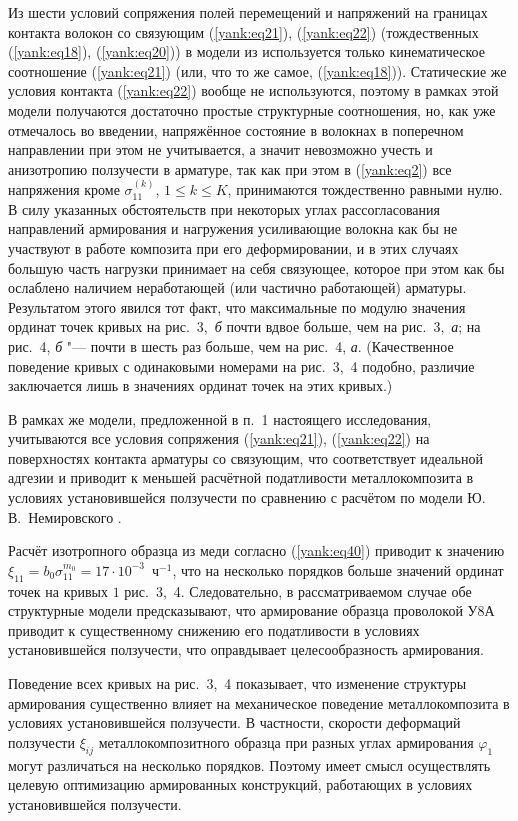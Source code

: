 Из шести условий сопряжения полей перемещений и напряжений на границах
контакта волокон со связующим (\ref{yank:eq21}), (\ref{yank:eq22}) (тождественных (\ref{yank:eq18}), (\ref{yank:eq20})) в модели
из \cite{yank:bib6,yank:bib17,yank:bib18} используется только кинематическое соотношение (\ref{yank:eq21}) (или, что
то же самое, (\ref{yank:eq18})). Статические же условия контакта (\ref{yank:eq22}) вообще не
используются, поэтому в рамках этой модели получаются достаточно простые
структурные соотношения, но, как уже отмечалось во введении, напряжённое
состояние в волокнах в поперечном направлении при этом не учитывается, а
значит невозможно учесть и анизотропию ползучести в арматуре, так как при
этом в (\ref{yank:eq2}) все напряжения кроме $\sigma _{11}^{(k)}$, $1\le k\le K$,
принимаются тождественно равными нулю. В силу указанных обстоятельств при
некоторых углах рассогласования направлений армирования и нагружения
усиливающие волокна как бы не участвуют в работе композита при его
деформировании, и в этих случаях большую часть нагрузки принимает на себя
связующее, которое при этом как бы ослаблено наличием неработающей (или
частично работающей) арматуры. Результатом этого явился тот факт, что
максимальные по модулю значения ординат точек кривых на рис.~3,~{\sl б} почти вдвое
больше, чем на рис.~3,~{\sl а}; на рис.~4, {\sl б} "--- почти в шесть раз больше, чем на
рис.~4, {\sl а}. (Качественное поведение кривых с одинаковыми номерами на рис.~3,~4
подобно, различие заключается лишь в значениях ординат точек на этих
кривых.)

В рамках же модели, предложенной в п.~1 настоящего исследования,
учитываются все условия сопряжения (\ref{yank:eq21}), (\ref{yank:eq22}) на поверхностях контакта
арматуры со связующим, что соответствует идеальной адгезии и приводит к
меньшей расчётной податливости металлокомпозита в условиях установившейся
ползучести по сравнению с расчётом по модели Ю.\,В.~Немировского \cite{yank:bib6,yank:bib17,yank:bib18}.

Расчёт изотропного образца из меди согласно (\ref{yank:eq40}) приводит к значению $\xi
_{11} =b_0 \sigma _{11}^{m_0 } =17\cdot 10^{-3}$~ч$^{-1}$, что на
несколько порядков больше значений ординат точек на кривых $1$ рис.~3,~4.
Следовательно, в рассматриваемом случае обе структурные модели
предсказывают, что армирование образца проволокой У8А приводит к
существенному снижению его податливости в условиях установившейся
ползучести, что оправдывает целесообразность армирования.

Поведение всех кривых на рис.~3,~4 показывает, что изменение структуры
армирования существенно влияет на механическое поведение металлокомпозита в
условиях установившейся ползучести. В частности, скорости деформаций
ползучести $\xi _{ij} $ металлокомпозитного образца при разных углах
армирования $\varphi _1 $ могут различаться на несколько порядков. Поэтому
имеет смысл осуществлять целевую оптимизацию армированных конструкций,
работающих в условиях установившейся ползучести.

